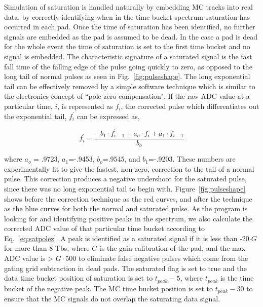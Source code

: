 Simulation of saturation is handled naturally by embedding MC tracks into real data, by correctly identifying when in the time bucket spectrum saturation has occurred in each pad. Once the time of saturation has been identified, no further signals are embedded as the pad is assumed to be dead. In the case a pad is dead for the whole event the time of saturation is set to the first time bucket and no signal is embedded. The characteristic signature of a saturated signal is the fast fall time of the falling edge of the pulse going quickly to zero, as opposed to the long tail of normal pulses as seen in Fig.~\ref{fig:pulseshape}. The long exponential tail can be effectively removed by a simple software technique which is similar to the electronics concept of ``pole-zero compensation". If the raw ADC value at a particular time, $i$, is represented as $f_i$, the corrected pulse which differentiates out the exponential tail, $f_i^{'}$ can be expressed as, 

\begin{equation}
f_i^{'} = \frac{-b_1\cdot f_{i-1}^{'} + a_o\cdot f_i + a_1 \cdot f_{i-1}}{b_o}
\label{eq:satpolez}
\end{equation}

where $a_o$ = .9723, $a_1$=-.9453, $b_o$=.9545, and $b_1$=-.9203. These numbers are experimentally fit to give the fastest, non-zero, correction to the tail of a normal pulse. This correction produces a negative undershoot for the saturated pulse, since there was no long exponential tail to begin with. Figure~\ref{fig:pulseshape} shows before the correction technique as the red curves, and after the technique as the blue curves for both the normal and saturated pulse. 
As the program is looking for and identifying positive peaks in the spectrum, we also calculate the corrected ADC value of that particular time bucket according to Eq.~\ref{eq:satpolez}. A peak is identified as a saturated signal if it is less than -20$\cdot G$ for more than 8 Tbs, where $G$ is the gain calibration of the pad, and the max ADC value is > $G\cdot$500 to eliminate false negative pulses which come from the gating grid subtraction in dead pads. The saturated flag is set to true and the data time bucket position of saturation is set to $t_{peak} - 5$, where $t_{peak}$ is the time bucket of the negative peak. The MC time bucket position is set to $t_{peak} - 30$ to ensure that the MC signals do not overlap the saturating data signal.

